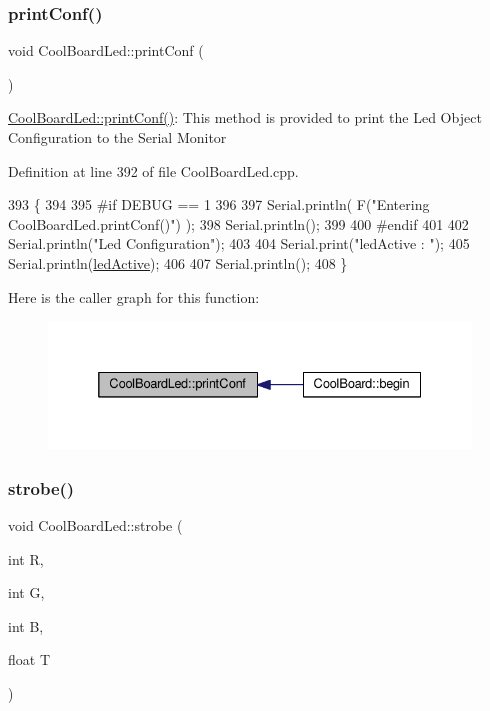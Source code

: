 \subsubsection{\texorpdfstring{print\+Conf()}{printConf()}}
{\footnotesize\ttfamily void Cool\+Board\+Led\+::print\+Conf (\begin{DoxyParamCaption}{ }\end{DoxyParamCaption})}

\hyperlink{class_cool_board_led_a8ed3053a36f0ed4a131f43b5b17efb61}{Cool\+Board\+Led\+::print\+Conf()}\+: This method is provided to print the Led Object Configuration to the Serial Monitor 

Definition at line 392 of file Cool\+Board\+Led.\+cpp.


\begin{DoxyCode}
393 \{
394 
395 \textcolor{preprocessor}{#if DEBUG == 1 }
396 
397     Serial.println( F(\textcolor{stringliteral}{"Entering CoolBoardLed.printConf()"}) );
398     Serial.println();
399 
400 \textcolor{preprocessor}{#endif}
401 
402     Serial.println(\textcolor{stringliteral}{"Led Configuration"});
403 
404     Serial.print(\textcolor{stringliteral}{"ledActive : "});
405     Serial.println(\hyperlink{class_cool_board_led_aadd04d2ecf123247718d77f42fba7f08}{ledActive});
406 
407     Serial.println();   
408 \}
\end{DoxyCode}
Here is the caller graph for this function\+:\nopagebreak
\begin{figure}[H]
\begin{center}
\leavevmode
\includegraphics[width=332pt]{de/dc0/class_cool_board_led_a8ed3053a36f0ed4a131f43b5b17efb61_icgraph}
\end{center}
\end{figure}
\mbox{\label{class_cool_board_led_ad5f0de4c628cbfbf49896042831c64ad}} 
\subsubsection{\texorpdfstring{strobe()}{strobe()}}
{\footnotesize\ttfamily void Cool\+Board\+Led\+::strobe (\begin{DoxyParamCaption}\item[{int}]{R,  }\item[{int}]{G,  }\item[{int}]{B,  }\item[{float}]{T }\end{DoxyParamCaption})}

